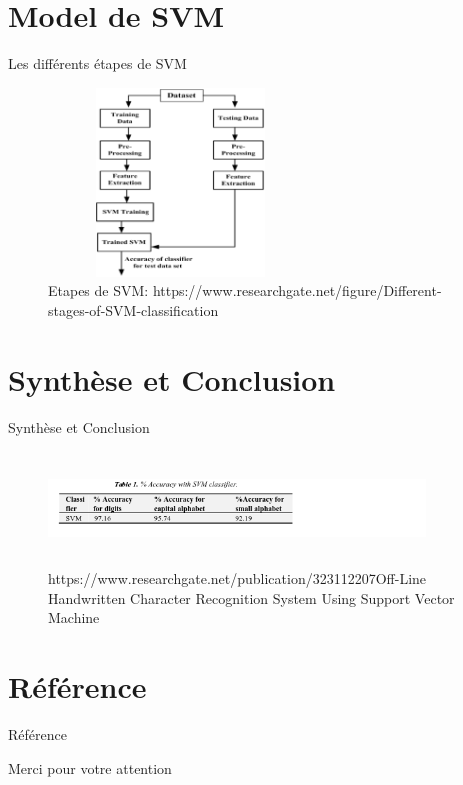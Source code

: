 \documentclass{beamer}
\begin{document}
\section{Model de SVM }
\begin{frame}{Les différents étapes de SVM } 
\begin{figure}[H]
    \includegraphics[width=7cm,height=5cm]{images/svm_methode.png}
    \caption{Etapes de SVM: https://www.researchgate.net/figure/Different-stages-of-SVM-classification}
    \label{fig:L1}
\end{figure}
\end{frame}


\section{Synthèse et Conclusion}
\begin{frame}{Synthèse et Conclusion}
\begin{figure}[H]
    \includegraphics[width=10cm,height=3cm]{images/accuracy.png}
    \caption{https://www.researchgate.net/publication/323112207Off-Line Handwritten Character Recognition System Using Support Vector Machine}
    \label{fig:L1}
\end{figure}
\end{frame}
\section{Référence}
\begin{frame}{Référence}
\renewcommand*{\bibfont}{\footnotesize}
\nocite{bibhand}
\printbibliography
\end{frame}

\begin{frame}
  \begin{block}{}
  \centering
  Merci pour votre attention
  \end{block}
\end{frame}
\end{document}
